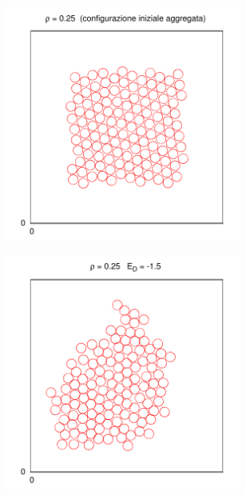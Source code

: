 \begin{figure}[htbp]
\begin{subfigure}[b]{0.5\textwidth}
        \end{subfigure}
        ~ %

        \begin{subfigure}[b]{0.5\textwidth}
                \centering
                \includegraphics[width=0.85\textwidth]{Immagini/Soffici/SnapSolidoFreddo_Inizio_2D}
        \end{subfigure}
         \begin{subfigure}[b]{0.5\textwidth}
                \centering
                \includegraphics[width=0.85\textwidth]{Immagini/Soffici/SnapSolidoFreddo_2D}
        \end{subfigure}
		

\end{figure}
